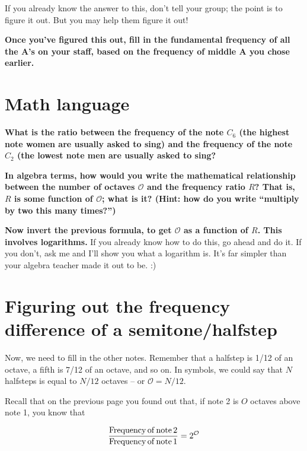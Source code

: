 \documentclass[10pt]{article}
\begin{document}
If you already know the answer to this, don't tell your group; the point is to figure it out. But you may help them figure it out!

{\bf Once you've figured this out, fill in the fundamental frequency of all the A's on your staff, based on the frequency of middle A you chose earlier.}

\medskip


\newpage

\section{Math language}

{\bf What is the ratio between the frequency of the note $C_6$ (the highest note women are usually asked to sing) and the frequency of the note $C_2$ (the lowest
note men are usually asked to sing?}

\vspace{1.5in}

{\bf In algebra terms, how would you write the mathematical relationship between the number of octaves $\mathcal O$ and the frequency ratio $R$? That is,
$R$ is some function of $\mathcal O$; what is it? (Hint: how do you write ``multiply by two this many times?'')}

\vspace{1.5in}

{\bf Now invert the previous formula, to get $\mathcal O$ as a function of $R$. This involves logarithms.} If you 
already know how to do this, go ahead and do it. If you don't, ask me and I'll show you what a logarithm is. It's far simpler than your algebra teacher
made it out to be. :)


\newpage

\section{Figuring out the frequency difference of a semitone/halfstep}

Now, we need to fill in the other notes. Remember that a halfstep is 1/12 of an octave, a fifth is 7/12 of an octave, and so on.
In symbols, we could say that $N$ halfsteps is equal to $N/12$ octaves -- or $\mathcal O = N/12$.

Recall that on the previous page you found out that, if note 2 is $O$ octaves above note 1, you know that 

$$
\large \frac{\rm Frequency\, of\, note\, 2}{\rm Frequency\,of\,note\,1} = 2^\mathcal O
$$
\end{document}
